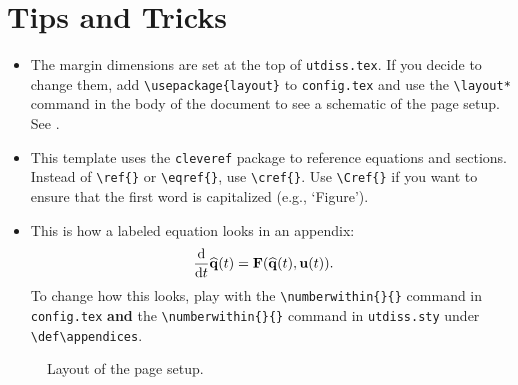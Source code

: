 \chapter{Tips and Tricks}
\label{appendix:tips}

\begin{itemize}
\item The margin dimensions are set at the top of \texttt{utdiss.tex}. If you decide to change them, add \verb"\usepackage{layout}" to \texttt{config.tex} and use the \verb"\layout*" command in the body of the document to see a schematic of the page setup.
See .

\item This template uses the \texttt{cleveref} package to reference equations and sections.
Instead of \verb"\ref{}" or \verb"\eqref{}", use \verb"\cref{}".
Use \verb"\Cref{}" if you want to ensure that the first word is capitalized (e.g., `Figure').

\item This is how a labeled equation looks in an appendix:
\begin{align}
    \frac{\textup{d}}{\textup{d}t}\widehat{\mathbf{q}}(t)
    &= \mathbf{F}(\widehat{\mathbf{q}}(t), \mathbf{u}(t)).
\end{align}
To change how this looks, play with the \verb"\numberwithin{}{}" command in \texttt{config.tex} \textbf{and} the \verb"\numberwithin{}{}" command in \texttt{utdiss.sty} under \verb"\def\appendices".
\end{itemize}

\newpage
\begin{figure}[t]
    \centering
    \layout*
    \vspace{.75in}
    \caption{Layout of the page setup.}
    \label{figure:layout}
\end{figure}
